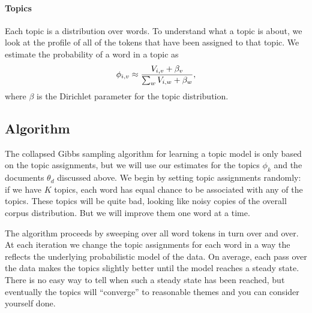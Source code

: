 \paragraph{Topics}

Each topic is a distribution over words.  To understand what a topic is about,
we look at the profile of all of the tokens that have been assigned to that
topic.  We estimate the probability of a word in a topic as
\begin{equation}
\phi_{i,v} \approx \frac{V_{i,v} + \beta_v}{\sum_w V_{i,w} + \beta_w},
\label{eq:phi_map}
\end{equation}
where $\beta$ is the Dirichlet parameter for the topic distribution.

\subsection{Algorithm}

The collapsed Gibbs sampling algorithm for learning a topic model is
only based on the topic assignments, but we will use our estimates for
the topics $\phi_k$ and the documents $\theta_d$ discussed above.  We
begin by setting topic assignments randomly: if we have $K$ topics,
each word has equal chance to be associated with any of the topics.
These topics will be quite bad, looking like noisy copies of the
overall corpus distribution. But we will improve them one word at a
time.

The algorithm proceeds by sweeping over all word tokens in turn over and over.
At each iteration we change the topic assignments for each word in a way the reflects the
underlying probabilistic model of the data.  On average, each pass over the data makes the
topics slightly better until the model reaches a steady state.  There is no easy way
to tell when such a steady state has been reached, but eventually the
topics will ``converge'' to reasonable themes and you can consider yourself done.

